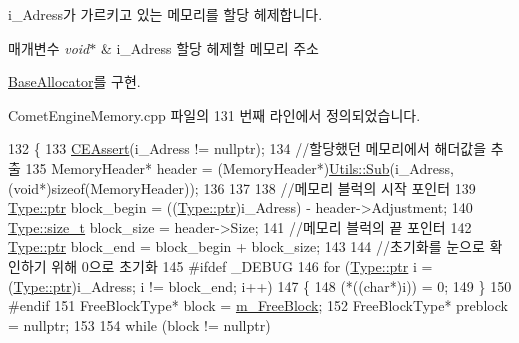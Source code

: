 i\+\_\+\+Adress가 가르키고 있는 메모리를 할당 헤제합니다. 


\begin{DoxyParams}{매개변수}
{\em void$\ast$} & i\+\_\+\+Adress 할당 헤제할 메모리 주소 \\
\hline
\end{DoxyParams}


\hyperlink{class_comet_engine_1_1_core_1_1_memory_1_1_base_allocator_acca0d1592319cfecb53f8333033a644b}{Base\+Allocator}를 구현.



Comet\+Engine\+Memory.\+cpp 파일의 131 번째 라인에서 정의되었습니다.


\begin{DoxyCode}
132 \{
133     \hyperlink{_comet_engine_types_8h_a9ade07b7881f4aeffa184676c123b87c}{CEAssert}(i\_Adress != \textcolor{keyword}{nullptr});
134     \textcolor{comment}{//할당했던 메모리에서 해더값을 추출}
135     MemoryHeader* header = (MemoryHeader*)\hyperlink{namespace_comet_engine_1_1_core_1_1_memory_1_1_utils_a4e360b8988f0de099daa987e3b5f09ed}{Utils::Sub}(i\_Adress, (\textcolor{keywordtype}{void}*)\textcolor{keyword}{sizeof}(MemoryHeader));
136 
137 
138     \textcolor{comment}{//메모리 블럭의 시작 포인터}
139     \hyperlink{namespace_comet_engine_1_1_type_aeb22ad46de677e9a50679dfebeb0e6f0}{Type::ptr} block\_begin = ((\hyperlink{namespace_comet_engine_1_1_type_aeb22ad46de677e9a50679dfebeb0e6f0}{Type::ptr})i\_Adress) - header->Adjustment;
140     \hyperlink{namespace_comet_engine_1_1_type_a7c94ea6f8948649f8d181ae55911eeaf}{Type::size\_t} block\_size = header->Size;
141     \textcolor{comment}{//메모리 블럭의 끝 포인터}
142     \hyperlink{namespace_comet_engine_1_1_type_aeb22ad46de677e9a50679dfebeb0e6f0}{Type::ptr} block\_end = block\_begin + block\_size;
143 
144     \textcolor{comment}{//초기화를 눈으로 확인하기 위해 0으로  초기화}
145 \textcolor{preprocessor}{#ifdef \_DEBUG}
146     \textcolor{keywordflow}{for} (\hyperlink{namespace_comet_engine_1_1_type_aeb22ad46de677e9a50679dfebeb0e6f0}{Type::ptr} i = (\hyperlink{namespace_comet_engine_1_1_type_aeb22ad46de677e9a50679dfebeb0e6f0}{Type::ptr})i\_Adress; i != block\_end; i++)
147     \{
148         (*((\textcolor{keywordtype}{char}*)i)) = 0;
149     \}
150 \textcolor{preprocessor}{#endif}
151     FreeBlockType* block = \hyperlink{class_comet_engine_1_1_core_1_1_memory_1_1_free_list_allocator_a9e6f8b10d6e94738d154d9f7c72d2538}{m\_FreeBlock};
152     FreeBlockType* preblock = \textcolor{keyword}{nullptr};
153 
154     \textcolor{keywordflow}{while} (block != \textcolor{keyword}{nullptr})

\end{DoxyCode}
